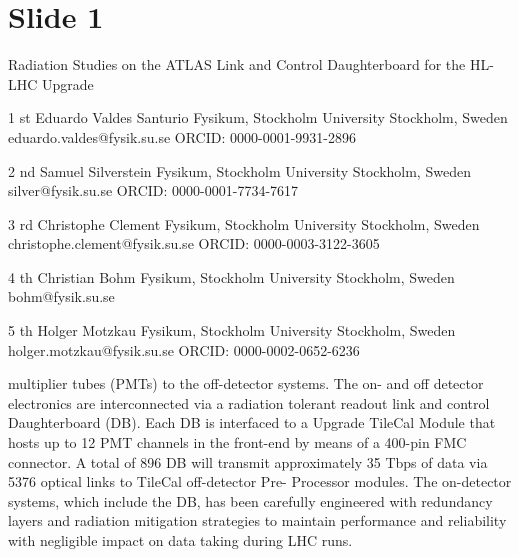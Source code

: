 \documentclass{article}
\begin{document}
\section*{Slide 1}

Radiation   Studies   on   the   ATLAS   Link   and   Control 
Daughterboard   for   the   HL-LHC   Upgrade

1 st   Eduardo   Valdes   Santurio 
Fysikum,   Stockholm   University 
Stockholm,   Sweden 
eduardo.valdes@fysik.su.se 
ORCID:   0000-0001-9931-2896

2 nd   Samuel   Silverstein 
Fysikum,   Stockholm   University 
Stockholm,   Sweden 
silver@fysik.su.se 
ORCID:   0000-0001-7734-7617

3 rd   Christophe   Clement 
Fysikum,   Stockholm   University 
Stockholm,   Sweden 
christophe.clement@fysik.su.se 
ORCID:   0000-0003-3122-3605

4 th   Christian   Bohm 
Fysikum,   Stockholm   University 
Stockholm,   Sweden 
bohm@fysik.su.se

5 th   Holger   Motzkau 
Fysikum,   Stockholm   University 
Stockholm,   Sweden 
holger.motzkau@fysik.su.se 
ORCID:   0000-0002-0652-6236

multiplier   tubes   (PMTs)   to   the   off-detector   systems.   The   on- 
and   off   detector   electronics   are   interconnected   via   a   radiation 
tolerant   readout   link   and   control   Daughterboard   (DB).   Each 
DB is interfaced to a Upgrade TileCal Module that hosts up to 
12 PMT channels in the front-end by means of a 400-pin FMC 
connector.   A   total   of   896   DB   will   transmit   approximately   35 
Tbps of data via 5376 optical links to TileCal off-detector Pre- 
Processor   modules.   The   on-detector   systems,   which   include 
the DB, has been carefully engineered with redundancy layers 
and   radiation   mitigation   strategies   to   maintain   performance 
and   reliability   with   negligible   impact   on   data   taking   during 
LHC   runs.
\end{document}
